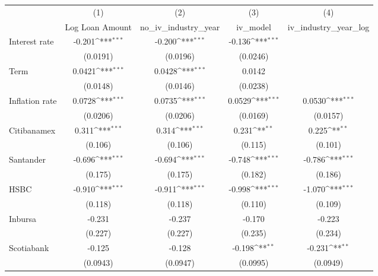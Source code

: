 {
\def\sym#1{\ifmmode^{#1}\else\(^{#1}\)\fi}
\begin{tabular}{l*{4}{c}}
\hline\hline
                &\multicolumn{1}{c}{(1)}&\multicolumn{1}{c}{(2)}&\multicolumn{1}{c}{(3)}&\multicolumn{1}{c}{(4)}\\
                &\multicolumn{1}{c}{Log Loan Amount}&\multicolumn{1}{c}{no_iv_industry_year}&\multicolumn{1}{c}{iv_model}&\multicolumn{1}{c}{iv_industry_year_log}\\
\hline
Interest rate   &   -0.201\sym{***}&   -0.200\sym{***}&   -0.136\sym{***}&                  \\
                & (0.0191)         & (0.0196)         & (0.0246)         &                  \\
Term            &   0.0421\sym{***}&   0.0428\sym{***}&   0.0142         &                  \\
                & (0.0148)         & (0.0146)         & (0.0238)         &                  \\
Inflation rate  &   0.0728\sym{***}&   0.0735\sym{***}&   0.0529\sym{***}&   0.0530\sym{***}\\
                & (0.0206)         & (0.0206)         & (0.0169)         & (0.0157)         \\
Citibanamex     &    0.311\sym{***}&    0.314\sym{***}&    0.231\sym{**} &    0.225\sym{**} \\
                &  (0.106)         &  (0.106)         &  (0.115)         &  (0.101)         \\
Santander       &   -0.696\sym{***}&   -0.694\sym{***}&   -0.748\sym{***}&   -0.786\sym{***}\\
                &  (0.175)         &  (0.175)         &  (0.182)         &  (0.186)         \\
HSBC            &   -0.910\sym{***}&   -0.911\sym{***}&   -0.998\sym{***}&   -1.070\sym{***}\\
                &  (0.118)         &  (0.118)         &  (0.110)         &  (0.109)         \\
Inbursa         &   -0.231         &   -0.237         &   -0.170         &   -0.223         \\
                &  (0.227)         &  (0.227)         &  (0.235)         &  (0.234)         \\
Scotiabank      &   -0.125         &   -0.128         &   -0.198\sym{**} &   -0.231\sym{**} \\
                & (0.0943)         & (0.0947)         & (0.0995)         & (0.0949)         \\

\end{tabular}}

